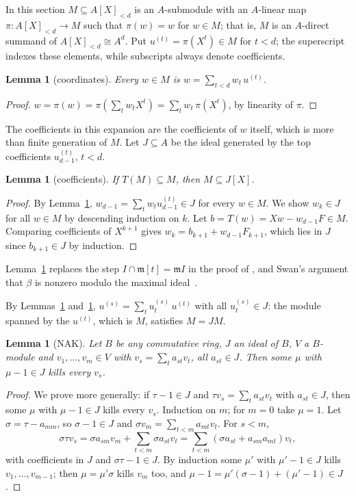 \documentclass[11pt]{amsart}
\newtheorem{lemma}[theorem]{Lemma}
\theoremstyle{remark}
\begin{document}
In this section $M\subseteq A[X]_{<d}$ is an $A$-submodule with an
$A$-linear map $\pi:A[X]_{<d}\to M$ such that $\pi(w)=w$ for $w\in M$; that
is, $M$ is an $A$-direct summand of $A[X]_{<d}\cong A^d$. Put
$u^{(t)}=\pi(X^t)\in M$ for $t<d$; the superscript indexes these elements,
while subscripts always denote coefficients.

\begin{lemma}[coordinates]\label{lem:span}
Every $w\in M$ is $w=\sum_{t<d}w_t\,u^{(t)}$.
\end{lemma}

\begin{proof}
$w=\pi(w)=\pi(\sum_tw_tX^t)=\sum_tw_t\,\pi(X^t)$, by linearity of $\pi$.
\end{proof}

The coefficients in this expansion are the coefficients of $w$ itself,
which is more than finite generation of $M$. Let $J\subseteq A$ be the ideal
generated by the top coefficients $u^{(t)}_{d-1}$, $t<d$.

\begin{lemma}[coefficients]\label{lem:coef}
If $T(M)\subseteq M$, then $M\subseteq J[X]$.
\end{lemma}

\begin{proof}
By Lemma~\ref{lem:span}, $w_{d-1}=\sum_tw_tu^{(t)}_{d-1}\in J$ for every
$w\in M$. We show $w_k\in J$ for all $w\in M$ by descending induction on
$k$. Let $b=T(w)=Xw-w_{d-1}F\in M$. Comparing coefficients of $X^{k+1}$
gives $w_k=b_{k+1}+w_{d-1}F_{k+1}$, which lies in $J$ since $b_{k+1}\in J$
by induction.
\end{proof}

Lemma~\ref{lem:coef} replaces the step $I\cap\mathfrak m[t]=\mathfrak mI$ in
the proof of \cite[Prop.~IV.5.2]{Lam}, and Swan's argument that $\beta$ is
nonzero modulo the maximal ideal~\cite[IV.3.4]{Lam78}.

By Lemmas~\ref{lem:span} and~\ref{lem:coef}, $u^{(s)}=\sum_tu^{(s)}_t\,u^{(t)}$
with all $u^{(s)}_t\in J$: the module spanned by the $u^{(t)}$, which is
$M$, satisfies $M=JM$.

\begin{lemma}[NAK]\label{lem:nak}
Let $B$ be any commutative ring, $J$ an ideal of $B$, $V$ a $B$-module and
$v_1,\dots,v_m\in V$ with $v_s=\sum_ta_{st}v_t$, all $a_{st}\in J$. Then some
$\mu$ with $\mu-1\in J$ kills every $v_s$.
\end{lemma}

\begin{proof}
We prove more generally: if $\tau-1\in J$ and $\tau v_s=\sum_ta_{st}v_t$ with
$a_{st}\in J$, then some $\mu$ with $\mu-1\in J$ kills every $v_s$. Induction
on $m$; for $m=0$ take $\mu=1$. Let $\sigma=\tau-a_{mm}$, so $\sigma-1\in J$
and $\sigma v_m=\sum_{t<m}a_{mt}v_t$. For $s<m$,
\[
\sigma\tau v_s=\sigma a_{sm}v_m+\textstyle\sum_{t<m}\sigma a_{st}v_t
=\sum_{t<m}(\sigma a_{st}+a_{sm}a_{mt})v_t,
\]
with coefficients in $J$ and $\sigma\tau-1\in J$. By induction some $\mu'$
with $\mu'-1\in J$ kills $v_1,\dots,v_{m-1}$; then $\mu=\mu'\sigma$ kills
$v_m$ too, and $\mu-1=\mu'(\sigma-1)+(\mu'-1)\in J$.
\end{proof}
\end{document}

